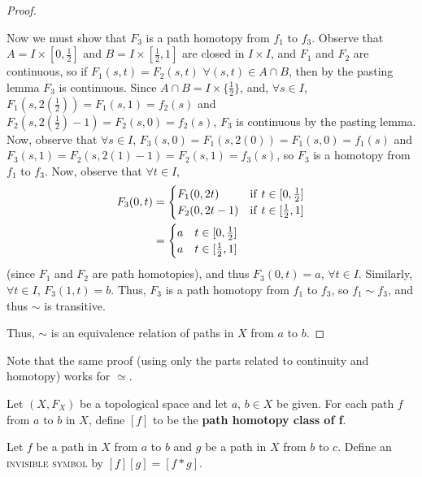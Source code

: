 \begin{proof}
\begin{itemize}
		Now we must show that $F_3$ is a path homotopy from $f_1$ to $f_3$. Observe that $A = I \times [0, \frac{1}{2}]$ and $B= I \times [\frac{1}{2}, 1]$ are closed in $I \times I$, and $F_1$ and $F_2$ are continuous, so if $F_1(s,t) = F_2(s,t)$ $\forall (s,t) \in A \cap B$, then by the pasting lemma $F_3$ is continuous. Since $A \cap B = I \times \{\frac{1}{2}\}$, and, $\forall s \in I$, $F_1(s, 2(\frac{1}{2})) = F_1(s, 1) = f_2(s)$ and $F_2(s, 2(\frac{1}{2}) - 1) = F_2(s, 0) = f_2(s)$, $F_3$ is continuous by the pasting lemma. Now, observe that $\forall s \in I$, $F_3(s, 0) = F_1(s, 2(0)) = F_1(s, 0) = f_1(s)$ and $F_3(s, 1) = F_2(s, 2(1) - 1) = F_2(s, 1) = f_3(s)$, so $F_3$ is a homotopy from $f_1$ to $f_3$. Now, observe that $\forall t \in I$, 
		\begin{align*}
			F_3(0,t) &= 
			\begin{cases}
				F_1(0,2t) & \mathrm{if }$ $ t \in [0, \frac{1}{2}]\\
				F_2(0,2t - 1) & \mathrm{if }$ $ t \in [\frac{1}{2}, 1] 
			\end{cases}
			\\
			&= 
			\begin{cases}
				a & t \in [0, \frac{1}{2}]\\
				a & t \in [\frac{1}{2}, 1] 
			\end{cases}
		\end{align*}
		(since $F_1$ and $F_2$ are path homotopies), and thus $F_3(0,t) = a$, $\forall t \in I$. Similarly, $\forall t \in I$, $F_3(1,t) = b$. Thus, $F_3$ is a path homotopy from $f_1$ to $f_3$, so $f_1 \sim f_3$, and thus $\sim$ is transitive. 
	\end{itemize}
	Thus, $\sim$ is an equivalence relation of paths in $X$ from $a$ to $b$. 
\end{proof}

Note that the same proof (using only the parts related to continuity and homotopy) works for $\simeq$.
\begin{definition}
	Let $(X, F_X)$ be a topological space and let $a$, $b \in X$ be given. For each path $f$ from $a$ to $b$ in $X$, define $[f]$ to be the \textbf{path homotopy class of f}. 
\end{definition}
\begin{definition}
	Let $f$ be a path in $X$ from $a$ to $b$ and $g$ be a path in $X$ from $b$ to $c$. Define an \textsc{invisible symbol} by $[f][g] = [f \ast g]$. 
\end{definition}

